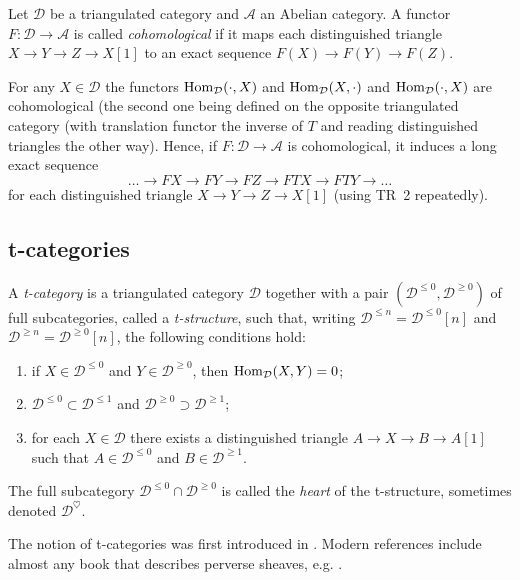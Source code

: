 \documentclass[english]{short-notes}
\renewcommand\cat{\mathcal}
\begin{document}
\begin{Def}
    Let $\cat D$ be a triangulated category and $\cat A$ an Abelian category.
    A functor $F\colon \cat D → \cat A$ is called \emph{cohomological} if it maps each distinguished triangle $X → Y → Z → X[1]$ to an exact sequence $F(X) → F(Y) → F(Z)$.
\end{Def}

\begin{Ex}
    For any $X ∈ \cat D$ the functors $\Hom_{\cat D}(\cdot, X)$ and $\Hom_{\cat D}(X,\cdot)$ and $\Hom_{\cat D}(\cdot, X)$  are cohomological (the second one being defined on the opposite triangulated category (with translation functor the inverse of $T$ and reading distinguished triangles the other way).
    Hence, if $F\colon \cat D → \cat A$ is cohomological, it induces a long exact sequence
    \[
    \dotsc → FX → FY → FZ → FTX → FTY → \dotsc
    \]
    for each distinguished triangle $X → Y → Z → X[1]$ (using TR~2 repeatedly).
\end{Ex}

\subsection{t-categories}

\begin{Def}
    A \emph{t-category} is a triangulated category $\cat D$ together with a pair $(\cat D^{≤0},\cat D^{≥0})$ of full subcategories, called a \emph{t-structure}, such that, writing $\cat D^{≤n} = \cat D^{≤0}[n]$ and $\cat D^{≥n} = \cat D^{≥0}[n]$, the following conditions hold:
    \begin{enumerate}
        \item if $X ∈ \cat D^{≤0}$ and $Y ∈ \cat D^{≥0}$, then $\Hom_{\cat D}(X,Y) = 0$;
        \item $\cat D^{≤0} ⊂ \cat D^{≤1}$ and $\cat D^{≥0} ⊃ \cat D^{≥1}$;
        \item for each $X ∈ \cat D$ there exists a distinguished triangle $A → X → B → A[1]$ such that $A ∈ \cat D^{≤0}$ and $B ∈ \cat D^{≥1}$.
    \end{enumerate}

    The full subcategory $\cat D^{≤0} ∩ \cat D^{≥0}$ is called the \emph{heart} of the t-structure, sometimes denoted $\cat D^\heartsuit$.
\end{Def}

The notion of t-categories was first introduced in \cite{BeilinsonBernsteinDeligne:1982:FaisceauxPervers}.
Modern references include almost any book that describes perverse sheaves, e.g. \cite{HottaTakeuchiTanisaki:2008:DModulesPerverseSheavesRepresentationTheory, PetersSteenbrink:2008:MixedHodgeStructures, KashiwaraSchapira:1994:SheavesOnManifolds}.
\end{document}
